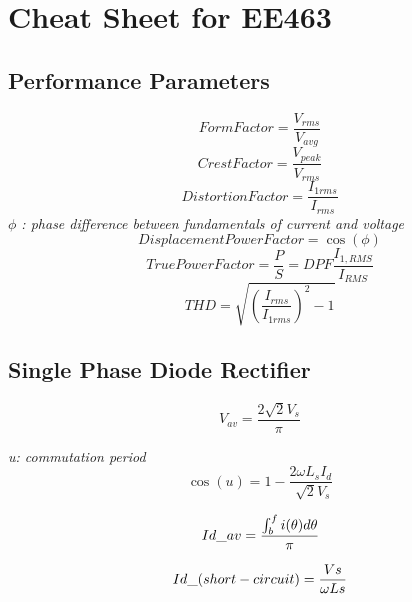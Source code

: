\documentclass[twocolumn, ]{article}
\begin{document}
\section*{\small Cheat Sheet for EE463}

\subsection*{\small Performance Parameters}
\begin{equation*}
Form Factor=\frac{V_{rms}}{V_{avg}}
\end{equation*}
\begin{equation*}
Crest Factor=\frac{V_{peak}}{V_{rms}}
\end{equation*}
\begin{equation*}
Distortion Factor=\frac{I_{1rms}}{I_{rms}}
\end{equation*}
\textit{$\phi$ : phase difference between fundamentals of current and voltage}
\begin{equation*}
Displacement Power Factor=\cos(\phi)
\end{equation*}
\begin{equation*}
True Power Factor=\frac{P}{S}=DPF \frac{I_{1,RMS}}{I_{RMS}}
\end{equation*}
\begin{equation*}
THD=\sqrt{(\frac{I_{rms}}{I_{1rms}})^2-1}
\end{equation*}



\subsection*{\small Single Phase Diode Rectifier}

\begin{equation*}
	V_{av}=\dfrac{2 \sqrt{2}V_{s}} { \pi}
\end{equation*}

\textit {u: commutation period}
\begin{equation*}
 	\cos(u)=1-\dfrac{2\omega L_{s} I_{d}}{\sqrt[]{2}V_{s}}
\end{equation*}

\begin{equation*}
 	\\ Id\_{av}= \dfrac{\int_b^f i(\theta) d \theta}{\pi}  \\
\end{equation*}

\begin{equation*}
 	\\ Id\_{(short-circuit)} = \dfrac{Vs}{\omega Ls}\\ 
\end{equation*}
\end{document}
